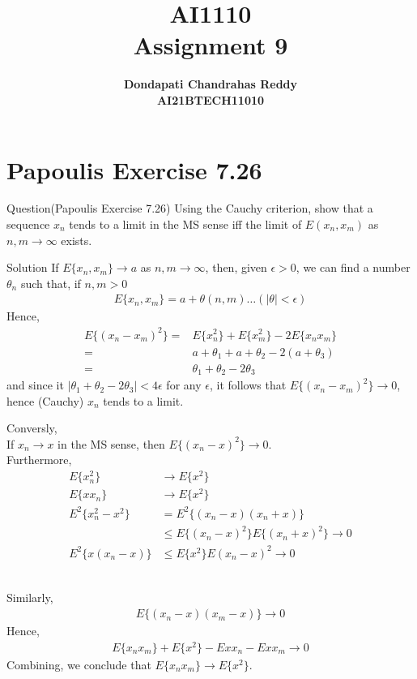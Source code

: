 \documentclass{beamer}
\title{\textbf{AI1110 \\ Assignment 9} }
\author{\textbf{Dondapati Chandrahas Reddy}\\\textbf{AI21BTECH11010}}
\begin{document}
	

\begin{frame}
	\titlepage 
\end{frame}


\section{Papoulis Exercise 7.26}
\begin{frame}{Question(Papoulis Exercise 7.26)}
	Using the Cauchy criterion, show that a sequence $x_n$ tends to a limit in the MS sense iff the limit of $E(x_n,x_m)$ as $n,m\rightarrow \infty$ exists.
\end{frame}

\begin{frame}{Solution}
	If $E\{x_n,x_m\} \rightarrow  a $ as $n,m \rightarrow  \infty$, then, given $\epsilon>0$, we can find a number $\theta_n$ such that, if $n,m > 0$
	\begin{align}
		E\{x_n,x_m\} = a + \theta(n,m) \dots (|\theta| < \epsilon)
	\end{align}
	Hence,
	\begin{align}
		E\{(x_n - x_m)^2\} = &E\{x_n ^2\} + E\{x_m ^2\} - 2E\{x_nx_m\} \\
		= &a + \theta_1 + a + \theta_2 - 2(a + \theta_3) \\
		= &\theta_1 + \theta_2 - 2\theta_3
	\end{align}
	and since it $|\theta_1 + \theta_2 - 2\theta_3| < 4\epsilon$ for any $\epsilon$, it follows that $E\{(x_n - x_m)^2\}\rightarrow 0$, hence (Cauchy) $x_n$ tends to a limit.
\end{frame}

\begin{frame}
	Conversly, \\
	If $x_n \rightarrow x$ in the MS sense, then $E\{(x_n - x)^2\} \rightarrow 0$. \\
	Furthermore,
	\begin{align}
		E\{x_n ^2\} &\rightarrow E\{x^2\} \\
		E\{xx_n\} &\rightarrow E\{x^2\} \\[2em]
		E^2\{x_n ^2 - x^2\} &= E^2 \{(x_n - x)(x_n + x)\} \\
		&\leq E\{(x_n - x)^2\}E\{(x_n + x)^2\} \rightarrow 0 \\
		E^2\{x(x_n -x)\} &\leq E\{x^2\}E{(x_n - x)^2} \rightarrow 0
	\end{align}\\
\end{frame}

\begin{frame}
	Similarly, 
	\begin{align}
		E\{(x_n - x)(x_m - x)\} \rightarrow 0
	\end{align}
	Hence,
	\begin{align}
		E\{x_nx_m\} + E\{x^2\} - E{xx_n} - E{xx_m} \rightarrow 0 
	\end{align}
	Combining, we conclude that $E\{x_nx_m\} \rightarrow E\{x^2\}$.
\end{frame}
\end{document}
